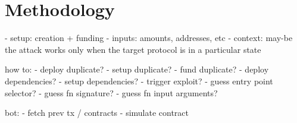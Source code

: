 \section{Methodology} \label{sec:methodology}

- setup: creation + funding
- inputs: amounts, addresses, etc
- context: may-be the attack works only when the target protocol is in a particular state

how to:
- deploy duplicate?
- setup duplicate?
- fund duplicate?
- deploy dependencies?
- setup dependencies?
- trigger exploit?
  - guess entry point selector?
  - guess fn signature?
  - guess fn input arguments?

bot:
- fetch prev tx / contracts
- simulate contract

